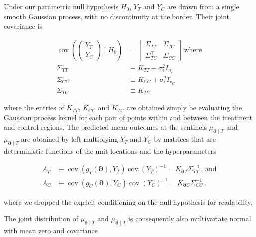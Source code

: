 \documentclass[letter]{article}
\newcommand{\genericdel}[3]{%
      \left#1#3\right#2
    }
\newcommand{\del}[1]{\genericdel(){#1}}
\DeclareMathOperator{\cov}{{cov}}
\newcommand{\trans}{^{\intercal}}
\newcommand{\sigman}{\sigma_{\epsilon}}
\newcommand{\boundary}{\partial}
\newcommand{\sentinels}{\bm{\boundary}}
\begin{document}
    	Under our parametric null hypothesis \(H_0\), \(Y_T\) and \(Y_C\) are
drawn from a single smooth Gaussian process, with no discontinuity at
the border. Their joint covariance is

\begin{equation}
\begin{aligned}
    \cov \del{\begin{pmatrix}Y_T \\ Y_C\end{pmatrix} \mid H_0 } &= \begin{bmatrix}
                        \Sigma_{TT} & \Sigma_{TC} \\
                        \Sigma\trans_{TC} & \Sigma_{CC}
                    \end{bmatrix}\,\text{where} \\
    \Sigma_{TT} &\equiv K_{TT} + \sigman^2 I_{n_T} \\
    \Sigma_{CC} &\equiv K_{CC} + \sigman^2 I_{n_C} \\
    \Sigma_{TC} &\equiv K_{TC}
\end{aligned}
\end{equation}

where the entries of \(K_{TT}\), \(K_{CC}\) and \(K_{TC}\) are obtained
simply be evaluating the Gaussian process kernel for each pair of points
within and between the treatment and control regions. The predicted mean
outcomes at the sentinels \(\mu_{\sentinels \mid T}\) and
\(\mu_{\sentinels \mid T}\) are obtained by left-multiplying \(Y_T\) and
\(Y_C\) by matrices that are deterministic functions of the unit
locations and the hyperparameters

\begin{equation}
\begin{split}
    A_T &\equiv \cov\del{g_T(\sentinels), Y_T} \cov\del{Y_T}^{-1} = K_{\sentinels T} \Sigma_{TT}^{-1} \,\text{, and} \\
    A_C &\equiv \cov\del{g_C(\sentinels), Y_C} \cov\del{Y_C}^{-1} = K_{\sentinels C} \Sigma_{CC}^{-1}\,.
\end{split}
\end{equation}

where we dropped the explicit conditioning on the null hypothesis for
readability.
    


    	The joint distribution of \(\mu_{\sentinels \mid T}\) and
\(\mu_{\sentinels \mid T}\) is consequently also multivariate normal
with mean zero and covariance
\end{document}
